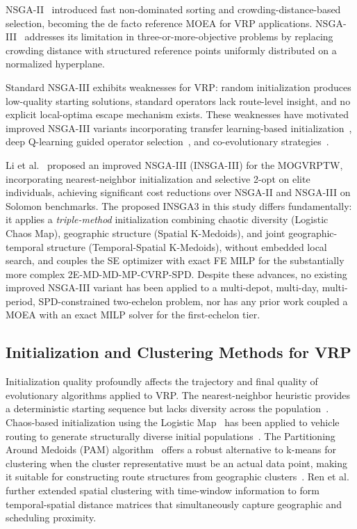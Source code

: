 \documentclass[11pt, a4paper]{article}
\numberwithin{equation}{section}
\begin{document}
NSGA-II~\cite{deb2002nsga2} introduced fast non-dominated sorting and
crowding-distance-based selection, becoming the de facto reference MOEA for VRP
applications.  NSGA-III~\cite{deb2014nsga3} addresses its limitation in
three-or-more-objective problems by replacing crowding distance with structured
reference points uniformly distributed on a normalized hyperplane.

Standard NSGA-III exhibits weaknesses for VRP: random initialization produces
low-quality starting solutions, standard operators lack route-level insight,
and no explicit local-optima escape mechanism exists.  These weaknesses have
motivated improved NSGA-III variants incorporating transfer learning-based
initialization~\cite{improvedNSGA3transfer}, deep Q-learning guided operator
selection~\cite{dqlNSGA3}, and co-evolutionary strategies~\cite{coevNSGA3}.

Li et al.~\cite{li2025} proposed an improved NSGA-III (INSGA-III) for the
MOGVRPTW, incorporating nearest-neighbor initialization and selective 2-opt
on elite individuals, achieving significant cost reductions over NSGA-II and
NSGA-III on Solomon benchmarks.
The proposed INSGA3 in this study differs fundamentally: it applies a
\emph{triple-method} initialization combining chaotic diversity (Logistic
Chaos Map), geographic structure (Spatial K-Medoids), and joint
geographic-temporal structure (Temporal-Spatial K-Medoids), without embedded
local search, and couples the SE optimizer with exact FE MILP for the
substantially more complex 2E-MD-MD-MP-CVRP-SPD\@.
Despite these advances, no existing improved NSGA-III variant has been applied
to a multi-depot, multi-day, multi-period, SPD-constrained two-echelon problem,
nor has any prior work coupled a MOEA with an exact MILP solver for the
first-echelon tier.

\subsection{Initialization and Clustering Methods for VRP}

Initialization quality profoundly affects the trajectory and final quality of
evolutionary algorithms applied to VRP\@.  The nearest-neighbor heuristic
provides a deterministic starting sequence but lacks diversity across the
population~\cite{li2025}.  Chaos-based initialization using the Logistic
Map~\cite{may1976} has been applied to vehicle routing to generate structurally
diverse initial populations~\cite{ren2024}.  The Partitioning Around Medoids
(PAM) algorithm~\cite{kaufman1990} offers a robust alternative to k-means for
clustering when the cluster representative must be an actual data point,
making it suitable for constructing route structures from geographic
clusters~\cite{wang2022collaborative}.  Ren et al.~\cite{ren2024} further
extended spatial clustering with time-window information to form
temporal-spatial distance matrices that simultaneously capture geographic and
scheduling proximity.
\end{document}
